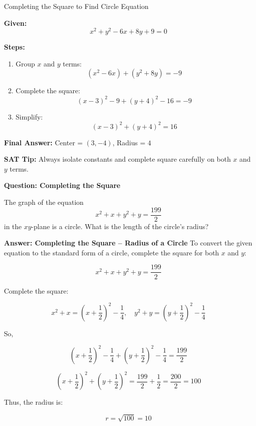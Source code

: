 \documentclass{beamer}
\begin{document}
\begin{frame}{Completing the Square to Find Circle Equation}
\small

\textbf{Given:}  
\[
x^2 + y^2 - 6x + 8y + 9 = 0
\]

\vspace{0.2cm}
\textbf{Steps:}
\begin{enumerate}
    \item Group $x$ and $y$ terms:
    \[
    (x^2 - 6x) + (y^2 + 8y) = -9
    \]
    \item Complete the square:
    \[
    (x - 3)^2 - 9 + (y + 4)^2 - 16 = -9
    \]
    \item Simplify:
    \[
    (x - 3)^2 + (y + 4)^2 = 16
    \]
\end{enumerate}

\vspace{0.2cm}
\textbf{Final Answer:} Center = $(3, -4)$, Radius = $4$

\textbf{SAT Tip:} Always isolate constants and complete square carefully on both $x$ and $y$ terms.

\end{frame}

\begin{frame}{\textbf{Question: Completing the Square }}

The graph of the equation 
\[
x^2 + x + y^2 + y = \frac{199}{2}
\]
in the \(xy\)-plane is a circle. What is the length of the circle’s radius?
\end{frame}


\begin{frame}{\textbf{Answer: Completing the Square – Radius of a Circle}}
\small
To convert the given equation to the standard form of a circle, complete the square for both \(x\) and \(y\):

\[
x^2 + x + y^2 + y = \frac{199}{2}
\]

Complete the square:

\[
x^2 + x = \left(x + \frac{1}{2}\right)^2 - \frac{1}{4}, \quad y^2 + y = \left(y + \frac{1}{2}\right)^2 - \frac{1}{4}
\]

So,

\[
\left(x + \frac{1}{2}\right)^2 - \frac{1}{4} + \left(y + \frac{1}{2}\right)^2 - \frac{1}{4} = \frac{199}{2}
\]

\[
\left(x + \frac{1}{2}\right)^2 + \left(y + \frac{1}{2}\right)^2 = \frac{199}{2} + \frac{1}{2} = \frac{200}{2} = 100
\]

Thus, the radius is:

\[
r = \sqrt{100} = 10
\]
\end{frame}
\end{document}
